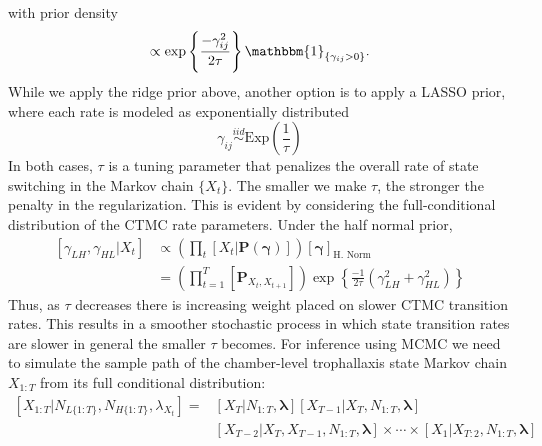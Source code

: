 \documentclass[smallextended]{svjour3}       %
\begin{document}
with prior density
\begin{equation}
[\gamma_{ij}] \propto \text{exp}\left\{\frac{-\gamma_{ij}^2}{2 \tau}\right\} \mathbbm{1}_{\{\gamma_{ij} > 0\}}.
\end{equation}
While we apply the ridge prior above, another option is to apply a LASSO prior, where each rate is modeled as exponentially distributed
\begin{equation}
\gamma_{ij} \stackrel{iid}{\sim} \text{Exp}\left(\frac{1}{\tau}\right)
\end{equation}
In both cases, $\tau$ is a tuning parameter that penalizes the overall rate of state switching in the Markov chain $\{X_t\}$. The smaller we make $\tau$, the stronger the penalty in the regularization. This is evident by considering the full-conditional distribution of the CTMC rate parameters.
Under the half normal prior, 
\begin{align}
\left[ \gamma_{LH}, \gamma_{HL} |X_t \right]
 &\propto \left(\prod_t [X_t | \mathbf{P}(\bm{\gamma})]\right) [\bm{\gamma}]_{\text{H. Norm}} \\
    &= \left(\prod_{t = 1}^T [\mathbf{P}_{X_t, X_{t+1}}]\right)  \exp\left\{\frac{-1}{2\tau} (\gamma_{LH}^2 + \gamma_{HL}^2) \right\}
\end{align}
Thus, as $\tau$ decreases there is increasing weight placed on slower CTMC transition rates. This results in a smoother stochastic process in which state transition rates are slower in general the smaller $\tau$ becomes.
For inference using MCMC we need to simulate the sample path of the chamber-level trophallaxis state Markov chain $X_{1:T}$ from its full conditional distribution:
\begin{equation}
\begin{split}
[X_{1:T}|N_{L\{1:T\}}, N_{H\{1:T\}}, \lambda_{X_t}] = &[X_T|N_{1:T}, \bm{\lambda}] [X_{T-1} | X_T, N_{1:T}, \bm{\lambda}]\\
&[X_{T-2} | X_T, X_{T-1}, N_{1:T}, \bm{\lambda}] \times \cdots \times [X_1|X_{T:2}, N_{1:T}, \bm{\lambda}]
\end{split}
\end{equation}
\end{document}
